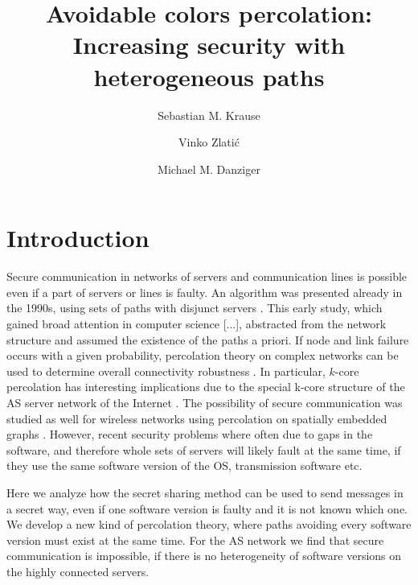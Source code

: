 \documentclass[aps, pre, twocolumn, a4paper, floatfix]{revtex4}
\begin{document}
\title{Avoidable colors percolation: Increasing security with heterogeneous paths}
\author{Sebastian M. Krause}
\author{Vinko Zlati\'{c}}
\author{Michael M. Danziger}
\begin{abstract}

\end{abstract}
\maketitle


\section{Introduction}


Secure communication in networks of servers and communication lines is
possible even if a part of servers or lines is faulty. 
An algorithm was presented already in the 1990s, using sets of paths with disjunct servers \cite{dolev-acm1993}.
This early study, which gained broad attention in computer science [...],
abstracted from the network structure and assumed the existence of the paths a priori. 
If node and link failure occurs with a given probability, 
percolation theory on complex networks can be used to determine overall connectivity robustness \cite{cohen-book2010,newman-book2010}. 
In particular, $k$-core percolation \cite{dorogovtsev-prl2006} has interesting implications
due to the special k-core structure of the AS server network of the
Internet \cite{tauro-ieee2001,carmi-pnas2007}. 
The possibility of secure communication was studied as
well for wireless networks using percolation on spatially embedded
graphs \cite{pinto-ieee2012}. 
However, recent security problems where often due to gaps in
the software, and therefore whole sets of servers will likely fault at
the same time, if they use the same software version of the OS, transmission
software etc.

Here we analyze how the secret sharing method can be used to send
messages in a secret way, even if one software version is faulty and it is
not known which one. We develop a new kind of percolation theory, where
paths avoiding every software version must exist at the same time.
For the AS network we find that secure communication is impossible, if
there is no heterogeneity of software versions on the highly connected
servers.
\end{document}
